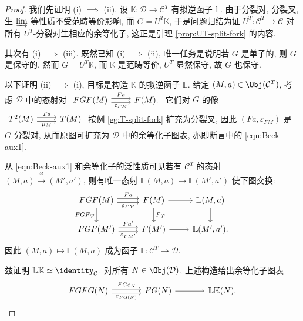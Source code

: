 \begin{proof}
	我们先证明 (i) $\implies$ (ii). 设 $\mathbb{K}: \mathcal{D} \to \mathcal{C}^T$ 有拟逆函子 $\mathbb{L}$. 由于分裂对, 分裂叉, 生 $\varinjlim$ 等性质不受范畴等价影响, 而 $G = U^T \mathbb{K}$, 于是问题归结为证 $U^T: \mathcal{C}^T \to \mathcal{C}$ 对所有 $U^T$-分裂对生相应的余等化子, 这正是引理 \ref{prop:UT-split-fork} 的内容.
	
	其次有 (i) $\implies$ (iii). 既然已知 (i) $\implies$ (ii), 唯一任务是说明若 $G$ 是单子的, 则 $G$ 是保守的. 然而 $G = U^T \mathbb{K}$, 而 $\mathbb{K}$ 是范畴等价, $U^T$ 显然保守, 故 $G$ 也保守.
	
	以下证明 (ii) $\implies$ (i), 目标是构造 $\mathbb{K}$ 的拟逆函子 $\mathbb{L}$. 给定 $(M, a) \in \Obj(\mathcal{C}^T)$, 考虑 $\mathcal{D}$ 中的态射对
	$\begin{tikzcd}
		FGF(M) \arrow[shift left, r, "Fa"] \arrow[shift right, r, "\varepsilon_{FM}"'] & F(M).
	\end{tikzcd}$
	它们对 $G$ 的像
	$\begin{tikzcd}
		T^2(M) \arrow[shift left, r, "Ta"] \arrow[shift right, r, "\mu_M"'] & T(M)
	\end{tikzcd}$\!
	按例 \ref{eg:T-split-fork} 扩充为分裂叉, 因此 $(Fa, \varepsilon_{FM})$ 是 $G$-分裂对, 从而原图可扩充为 $\mathcal{D}$ 中的余等化子图表, 亦即断言中的 \eqref{eqn:Beck-aux1}.
	
	从 \eqref{eqn:Beck-aux1} 和余等化子的泛性质可见若有 $\mathcal{C}^T$ 的态射 $(M, a) \xrightarrow{\varphi} (M', a')$, 则有唯一态射 $\mathbb{L}(M, a) \to \mathbb{L}(M', a')$ 使下图交换:
	\begin{equation*}\begin{tikzcd}
		FGF(M) \arrow[shift left, r, "Fa"] \arrow[shift right, r, "\varepsilon_{FM}"'] \arrow[d, "FGF\varphi"'] & F(M) \arrow[r] \arrow[d, "F\varphi"] & \mathbb{L}(M, a) \arrow[d] \\
		FGF(M') \arrow[shift left, r, "{Fa'}"] \arrow[shift right, r, "\varepsilon_{FM'}"'] & F(M') \arrow[r] & \mathbb{L}(M', a'). 
	\end{tikzcd}\end{equation*}
	因此 $(M, a) \mapsto \mathbb{L}(M, a)$ 成为函子 $\mathbb{L}: \mathcal{C}^T \to \mathcal{D}$.
	
	兹证明 $\mathbb{L}\mathbb{K} \simeq \identity_{\mathcal{C}}$. 对所有 $N \in \Obj(\mathcal{D})$, 上述构造给出余等化子图表
	\begin{equation*}\begin{tikzcd}[column sep=large]
		FGFG(N) \arrow[shift left, r, "FG\varepsilon_N"] \arrow[shift right, r, "\varepsilon_{FG(N)}"'] & FG(N) \arrow[r] & \mathbb{L}\mathbb{K}(N).
	\end{tikzcd}\end{equation*}


\end{proof}
